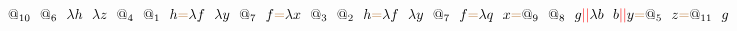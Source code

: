 \documentclass[a4paper, 10pt]{article}
\newcommand{\tikzmark}[3][]{\tikz[remember picture,baseline] \node [inner xsep=0pt,anchor=base,#1](#2) {#3};}
\begin{document}
\[\tikzmark{1}{$@_{10}$}\ \ \tikzmark{2}{$@_6$}\ \ \tikzmark{3}{$\lambda h$}\ \ \tikzmark{4}{$\lambda z$}\ \ \tikzmark{5}{$@_4$}\ \ \tikzmark{6}{$@_1$}\ \ \tikzmark{7}{$h$}\tikzmark{}{\color{brown}{=}}\tikzmark{8}{$\lambda f$}\ \ \tikzmark{9}{$\lambda y$}\ \ \tikzmark{10}{$@_7$}\ \ \tikzmark{11}{$f$}\tikzmark{}{\color{brown}{=}}\tikzmark{12}{$\lambda x$}\ \ \tikzmark{13}{$@_3$}\ \ \tikzmark{14}{$@_2$}\ \ \tikzmark{15}{$h$}\tikzmark{}{\color{brown}{=}}\tikzmark{16}{$\lambda f$}\ \ \tikzmark{17}{$\lambda y$}\ \ \tikzmark{18}{$@_7$}\ \ \tikzmark{19}{$f$}\tikzmark{}{\color{brown}{=}}\tikzmark{20}{$\lambda q$}\ \ \tikzmark{21}{$x$}\tikzmark{}{\color{brown}{=}}\tikzmark{22}{$@_9$}\ \ \tikzmark{23}{$@_8$}\ \ \tikzmark{24}{$g$}\tikzmark{}{\color{red}{||}}\tikzmark{25}{$\lambda b$}\ \ \tikzmark{26}{$b$}\tikzmark{}{\color{red}{||}}\tikzmark{27}{$y$}\tikzmark{}{\color{brown}{=}}\tikzmark{29}{$@_5$}\ \ \tikzmark{30}{$z$}\tikzmark{}{\color{brown}{=}}\tikzmark{31}{$@_{11}$}\ \ \tikzmark{32}{$g$}\]
\end{document}
